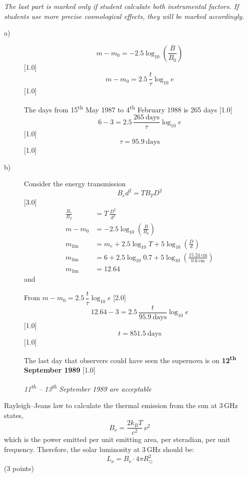 \emph{The last part is marked only if student calculate both instrumental
factors. If students use more precise cosmological effects, they will be
marked accordingly.}

\begin{description}
\item[a)]
  \[ m - m_0 = -2.5\log_{10}\left(\frac{B}{B_0}\right) \]
  \hfill[1.0]
  \[ m - m_0 = 2.5\,\frac{t}{\tau}\log_{10} e \]
  \hfill[1.0]

  The days from 15\textsuperscript{th} May 1987 to 4\textsuperscript{th}
  February 1988 is 265 days \hfill[1.0]
  \[ 6 - 3 = 2.5\,\frac{265\ \mathrm{days}}{\tau}\log_{10} e \]
  \hfill[1.0]
  \[ \tau = 95.9\ \mathrm{days} \]
  \hfill[1.0]
\item[b)]
  Consider the energy transmission
  \[ B_e d^2 = T B_T D^2 \]
  \hfill[3.0]
  \begin{align*}
  \frac{B_e}{B_T} &= T\,\frac{D^2}{d^2}\\
  m - m_0 &= -2.5\log_{10}\left(\frac{B}{B_0}\right)
    \tag*{[1.0]}\\
  m_{\mathrm{lim}} &= m_e + 2.5\log_{10} T
    + 5\log_{10}\left(\frac{D}{d}\right)
    \tag*{[1.0]}\\
  m_{\mathrm{lim}} &= 6 + 2.5\log_{10} 0.7
    + 5\log_{10}\left(\frac{15.24\ \mathrm{cm}}{0.6\ \mathrm{cm}}\right)\\
  m_{\mathrm{lim}} &= 12.64
  \end{align*}
  and

  From $m - m_0 = 2.5\,\dfrac{t}{\tau}\log_{10} e$ \hfill[2.0]
  \[ 12.64 - 3 = 2.5\,\frac{t}{95.9\ \mathrm{days}}\log_{10} e \]
  \hfill[1.0]
  \[ t = 851.5\ \mathrm{days} \]
  \hfill[1.0]

  The last day that observers could have seen the supernova is on
  \textbf{12\textsuperscript{th} September 1989} \hfill[1.0]

  \emph{11\textsuperscript{th} -- 13\textsuperscript{th} September 1989 are
  acceptable}
\end{description}

Rayleigh--Jeans law to calculate the thermal emission from the sun at 3\,GHz
states,
\[ B_\nu = \frac{2k_B T}{c^2}\,\nu^2 \]
which is the power emitted per unit emitting area, per steradian, per unit
frequency. Therefore, the solar luminosity at 3\,GHz should be:
\[ L_\nu = B_\nu \cdot 4\pi R_\odot^2 \]
\hfill(3 points)

